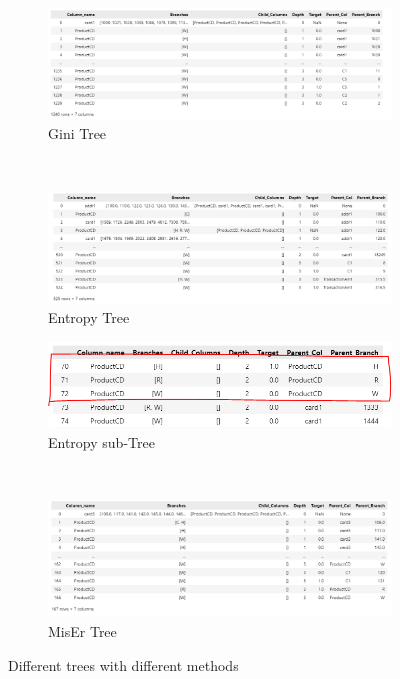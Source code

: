 \documentclass{article}
\begin{document}
\begin{figure}[H]
  \centering

  \begin{subfigure}[t]{.9\linewidth}
    \centering\includegraphics[width=1\linewidth]{Fig/Gini.png}
    \caption{Gini Tree}
  \end{subfigure}\\
  
  \begin{subfigure}[t]{.9\linewidth}
    \centering\includegraphics[width=1\linewidth]{Fig/Entropy.png}
    \caption{Entropy Tree}
  \end{subfigure}
  \begin{subfigure}[t]{.7\linewidth}
    \centering\includegraphics[width=1\linewidth]{Fig/Entropy_Sub.png}
    \caption{Entropy sub-Tree}
  \end{subfigure}
  \\

    \begin{subfigure}[t]{.9\linewidth}
    \centering\includegraphics[width=1\linewidth]{Fig/MisEr.png}
    \caption{MisEr Tree}
  \end{subfigure}
  
  
  \caption{Different trees with different methods}
\end{figure}
\end{document}
